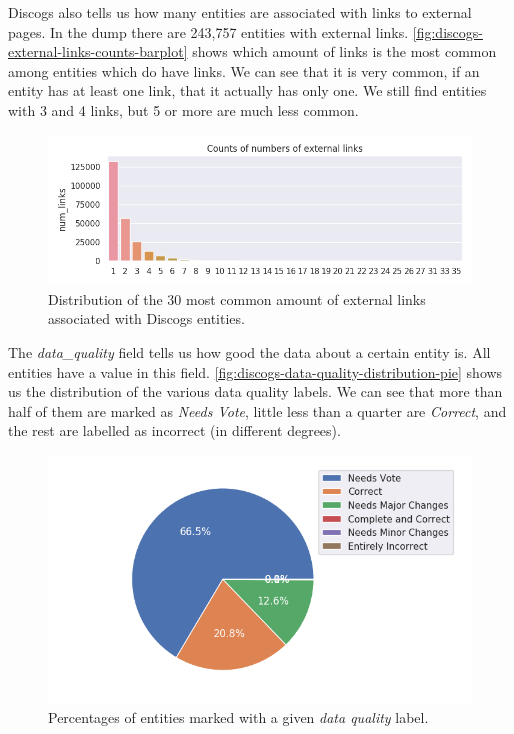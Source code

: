 \documentclass[epsfig,a4paper,11pt,titlepage,twoside,openany]{book}
\begin{document}
Discogs also tells us how many entities are associated with links to external pages. In the dump there are 243,757 entities with external links. \autoref{fig:discogs-external-links-counts-barplot} shows which amount of links is the most common among entities which do have links. We can see that it is very common, if an entity has at least one link, that it actually has only one. We still find entities with 3 and 4 links, but 5 or more are much less common.

\begin{figure}[]
  \centering \includegraphics[width=\textwidth]{discogs_external_links_counts} 
  \caption{Distribution of the 30 most common amount of external links associated with Discogs entities.}
  \label{fig:discogs-external-links-counts-barplot}
\end{figure}

The \textit{data\_quality} field tells us how good the data about a certain entity is. All entities have a value in this field. \autoref{fig:discogs-data-quality-distribution-pie} shows us the distribution of the various data quality labels. We can see that more than half of them are marked as \textit{Needs Vote}, little less than a quarter are \textit{Correct}, and the rest are labelled as incorrect (in different degrees).

\begin{figure}[]
  \centering \includegraphics[width=\textwidth]{discogs_data_quality_distribution} 
  \caption{Percentages of entities marked with a given \textit{data quality} label.}
  \label{fig:discogs-data-quality-distribution-pie}
\end{figure}
\end{document}
